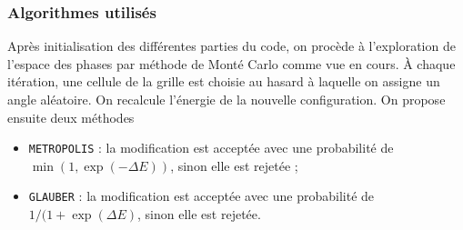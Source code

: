 \documentclass[a4paper, 11pt]{article}
\begin{document}
\subsubsection{Algorithmes utilisés}

Après initialisation des différentes parties du code, on procède à l'exploration de l'espace des
phases par méthode de Monté Carlo comme vue en cours. À chaque itération, une cellule de la grille
est choisie au hasard à laquelle on assigne un angle aléatoire. On recalcule l'énergie de la
nouvelle configuration. On propose ensuite deux méthodes
\begin{itemize}
    \item  \texttt{METROPOLIS} : la modification est acceptée avec une probabilité de $\min(1, \exp(-\Delta
        E))$, sinon elle est rejetée ;
    \item \texttt{GLAUBER} : la modification est acceptée avec une probabilité de $1/(1+\exp(\Delta
        E)$, sinon elle est rejetée.
\end{itemize}
\end{document}
